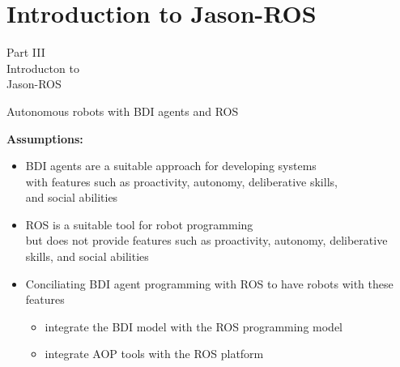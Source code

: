 \documentclass[compress]{beamer}
\begin{document}
\section{Introduction to Jason-ROS}

\begin{frame}
 

 \HUGE
\centering
Part III\\
Introducton to \\
Jason-ROS 
 
\end{frame}


\begin{frame}{Autonomous robots with BDI agents and ROS}

\footnotesize
{\bf Assumptions:}
\vspace{.3cm}

\begin{itemize}\scriptsize
 
 
 \item BDI agents are a suitable approach for developing systems\\
 with features such as  proactivity, autonomy, deliberative skills,\\ and social abilities
 
 \vspace{.3cm}
 
 \item ROS is a suitable tool for robot programming \\
 {\tiny but does not provide features such as proactivity, autonomy, deliberative skills, and social abilities}
 
 \vspace{.3cm}
 
 \item Conciliating BDI agent programming with ROS to have robots with these features
 \begin{itemize} \ssmall
  \item integrate the BDI model with the ROS programming model  
  \item integrate AOP tools with the ROS platform
 \end{itemize}

\end{itemize}

 
\end{frame}
\end{document}
